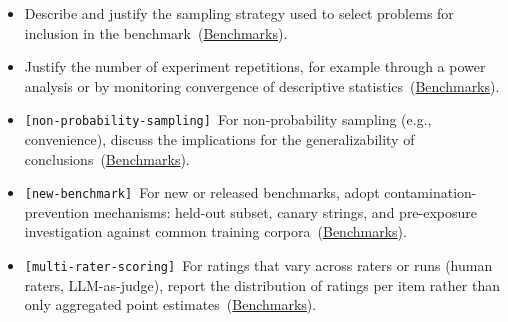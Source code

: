 \documentclass[smallextended]{svjour3}
\makeatletter
\newcommand{\should}{\textbf{should}\xspace}
\newcommand{\iconS}{\usebox{\iconSbox}\xspace}
\newcommand{\iconS}{○\xspace}
\newcommand{\condition}[1]{\texttt{\small[#1]}\,}
\newcommand{\condition}[1]{@@cond:#1@@}
\newcommand{\refbenchmarks}{\hyperref[sec:use-suitable-baselines-benchmarks-and-metrics]{Benchmarks}}
\newcommand{\refbenchmarks}{\href{/guidelines/use-suitable-baselines-benchmarks-and-metrics/}{Benchmarks}}
\makeatother
\begin{document}
\begin{appendices}
\begin{itemize}[label={},leftmargin=*]
    \item \iconS Describe and justify the sampling strategy used to select problems for inclusion in the benchmark~(\refbenchmarks).
    \item \iconS Justify the number of experiment repetitions, for example through a power analysis or by monitoring convergence of descriptive statistics~(\refbenchmarks).
    \item \iconS \condition{non-probability-sampling} For non-probability sampling (e.g., convenience), discuss the implications for the generalizability of conclusions~(\refbenchmarks).
    \item \iconS \condition{new-benchmark} For new or released benchmarks, adopt contamination-prevention mechanisms: held-out subset, canary strings, and pre-exposure investigation against common training corpora~(\refbenchmarks).
    \item \iconS \condition{multi-rater-scoring} For ratings that vary across raters or runs (human raters, LLM-as-judge), report the distribution of ratings per item rather than only aggregated point estimates~(\refbenchmarks).
\end{itemize}


\end{appendices}
\end{document}
